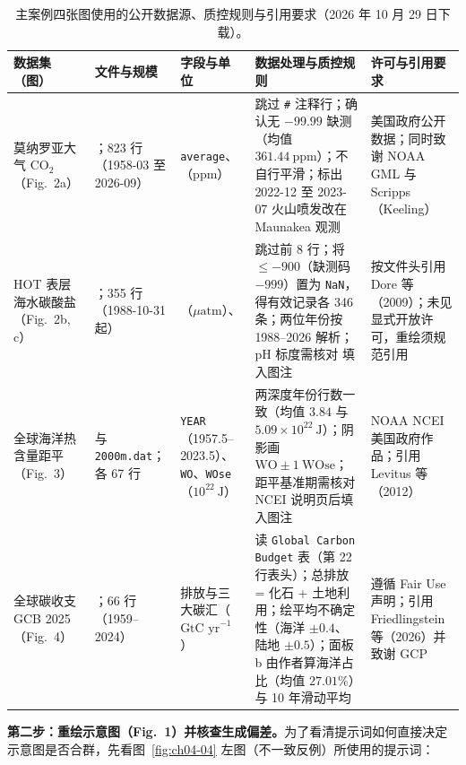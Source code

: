 \begin{table}[htbp]\centering\scriptsize
\setlength{\tabcolsep}{2.5pt}
\renewcommand{\arraystretch}{1.12}
\caption{主案例四张图使用的公开数据源、质控规则与引用要求（2026 年 10 月 29 日下载）。}\label{tab:ch04-sources}
\begin{tabularx}{\linewidth}{@{}>{\raggedright\arraybackslash}p{20mm}>{\raggedright\arraybackslash}p{24mm}>{\raggedright\arraybackslash}p{18mm}Y>{\raggedright\arraybackslash}p{26mm}@{}}
\toprule
\textbf{数据集（图）} & \textbf{文件与规模} & \textbf{字段与单位} & \textbf{数据处理与质控规则} & \textbf{许可与引用要求} \\
\midrule
莫纳罗亚大气 $\text{CO}_2$（Fig.\ 2a） & ；823 行（1958-03 至 2026-09） & \texttt{average}、（ppm） & 跳过 \texttt{\#} 注释行；确认无 $-99.99$ 缺测（均值 $361.44\ \text{ppm}$）；不自行平滑；标出 2022-12 至 2023-07 火山喷发改在 Maunakea 观测 & 美国政府公开数据；同时致谢 NOAA GML 与 Scripps（Keeling） \\
HOT 表层海水碳酸盐（Fig.\ 2b, c） & ；355 行（1988-10-31 起） & （$\mu\text{atm}$）、 & 跳过前 8 行；将 $\le -900$（缺测码 $-999$）置为 \texttt{NaN}，得有效记录各 346 条；两位年份按 1988–2026 解析；pH 标度需核对  填入图注 & 按文件头引用 Dore 等（2009）；未见显式开放许可，重绘须规范引用 \\
全球海洋热含量距平（Fig.\ 3） &  与 \texttt{2000m.dat}；各 67 行 & \texttt{YEAR}（1957.5–2023.5）、\texttt{WO}、\texttt{WOse}（$10^{22}\ \text{J}$） & 两深度年份行数一致（均值 $3.84$ 与 $5.09\times 10^{22}\ \text{J}$）；阴影画 $\text{WO} \pm 1\ \text{WOse}$；距平基准期需核对 NCEI 说明页后填入图注 & NOAA NCEI 美国政府作品；引用 Levitus 等（2012） \\
全球碳收支 GCB 2025（Fig.\ 4） & ；66 行（1959–2024） & 排放与三大碳汇（$\text{GtC yr}^{-1}$） & 读 \texttt{Global Carbon Budget} 表（第 22 行表头）；总排放 = 化石 + 土地利用；绘平均不确定性（海洋 $\pm 0.4$、陆地 $\pm 0.5$）；面板 b 由作者算海洋占比（均值 $27.01\%$）与 10 年滑动平均 & 遵循 Fair Use 声明；引用 Friedlingstein 等（2026）并致谢 GCP \\
\bottomrule
\end{tabularx}
\end{table}

\textbf{第二步：重绘示意图（Fig.\ 1）并核查生成偏差。}为了看清提示词如何直接决定示意图是否合群，先看图~\ref{fig:ch04-04} 左图（不一致反例）所使用的提示词：

